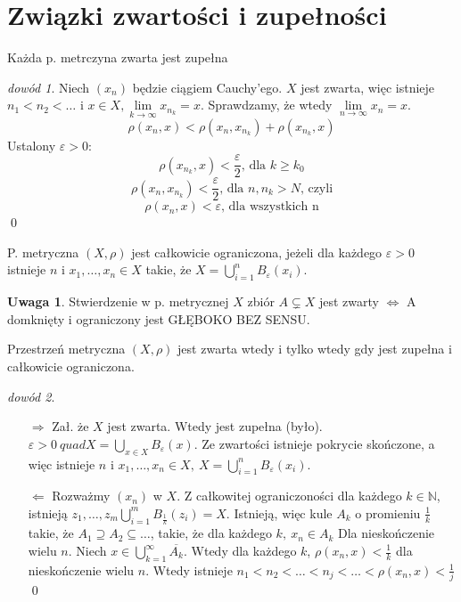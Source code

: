 \documentclass[twoside,10pt]{article}
\theoremstyle{definition}
\theoremstyle{definition}
\theoremstyle{definition}
\theoremstyle{definition}
\theoremstyle{remark}
\newtheorem*{dd}{dowód}
\theoremstyle{definition}
\newtheorem*{uw}{Uwaga}
\theoremstyle{definition}
\theoremstyle{definition}
\theoremstyle{definition}
\theoremstyle{definition}
\theoremstyle{definition}
\begin{document}
\section{Związki zwartości i zupełności} 
\begin{tw} Każda p. metrczyna zwarta jest zupełna \end{tw} 
\begin{dd} Niech $(x_n)$ będzie ciągiem Cauchy'ego. $X$ jest zwarta, więc istnieje $n_1 < n_2 < \ldots$ 
    i $x \in X, \lim\limits_{k \to \infty} x_{n_k} = x$. Sprawdzamy, że wtedy $\lim\limits_{n \to \infty} x_n = x$. 
    $$ \rho(x_n,x) < \rho(x_n,x_{n_k}) + \rho(x_{n_k},x) $$
    Ustalony $\varepsilon > 0$: 
    $$ \rho(x_{n_k},x) < \frac{\varepsilon}{2} \text{, dla } k \ge k_0$$
    $$\rho(x_n,x_{n_k}) < \frac{\varepsilon}{2} \text{, dla } n,n_k > N \text{, czyli}$$
    $$\rho(x_n,x) < \varepsilon \text{, dla wszystkich n}$$
    \hfill \qed
\end{dd} 
\begin{df} P. metryczna $(X,\rho)$ jest całkowicie ograniczona, jeżeli dla każdego $\varepsilon > 0$ istnieje 
    $n$ i $x_1,\ldots,x_n \in X$ takie, że $X = \bigcup\limits_{i=1}^n B_\varepsilon(x_i)$.
\end{df}
\begin{uw} Stwierdzenie w p. metrycznej $X$ zbiór $A \subsetneq X$ jest zwarty $\Leftrightarrow$ A domknięty i ograniczony jest GŁĘBOKO BEZ SENSU. \end{uw}
\begin{tw} Przestrzeń metryczna $(X,\rho)$ jest zwarta wtedy i tylko wtedy gdy jest zupełna i całkowicie ograniczona. \end{tw} 
\begin{dd} \hfill 
    \begin{itemize} 
        \item[$\Rightarrow$] Zał. że $X$ jest zwarta. Wtedy jest zupełna (było). \\ 
        $\varepsilon > 0 \ quad X = \bigcup\limits_{x \in X} B_\varepsilon(x)$. Ze zwartości istnieje pokrycie skończone, 
        a więc istnieje $n$ i $x_1,\ldots,x_n \in X, \ X = \bigcup\limits_{i=1}^n B_\varepsilon(x_i)$. 
        \item[$\Leftarrow$] Rozważmy $(x_n)$ w $X$. Z całkowitej ograniczoności dla każdego $k \in \mathbb{N}$,
            istnieją $z_1,\ldots,z_m \bigcup\limits_{i=1}^m B_{\frac{1}{k}}(z_i) = X$. 
            Istnieją, więc kule $A_k$ o promieniu $\frac{1}{k}$ takie, że $A_1 \supseteq A_2 \subseteq \ldots$, 
            takie, że dla każdego $k, \ x_n \in A_k$ Dla nieskończenie wielu $n$.
            Niech $x \in \bigcup\limits_{k=1}^\infty \overline{A_k}$. Wtedy dla każdego 
            $k$, $\rho(x_n,x) < \frac{1}{k}$ dla nieskończenie wielu $n$. Wtedy istnieje $n_1 < n_2 < 
            \ldots < n_j < \ldots < \rho(x_n,x) < \frac{1}{j}$ 
        \hfill \qed
    \end{itemize} 
\end{dd}
\end{document}
